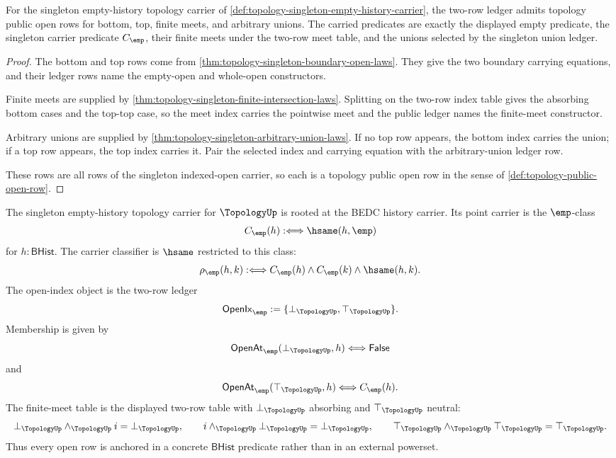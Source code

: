 \begin{theorem}
\label{thm:topology-singleton-public-open-row-coverage}
For the singleton empty-history topology carrier of \autoref{def:topology-singleton-empty-history-carrier}, the two-row ledger admits topology public open rows for bottom, top, finite meets, and arbitrary unions. The carried predicates are exactly the displayed empty predicate, the singleton carrier predicate $C_{\emp}$, their finite meets under the two-row meet table, and the unions selected by the singleton union ledger.
\end{theorem}
\begin{proof}
The bottom and top rows come from \autoref{thm:topology-singleton-boundary-open-laws}. They give the two boundary carrying equations, and their ledger rows name the empty-open and whole-open constructors.

Finite meets are supplied by \autoref{thm:topology-singleton-finite-intersection-laws}. Splitting on the two-row index table gives the absorbing bottom cases and the top-top case, so the meet index carries the pointwise meet and the public ledger names the finite-meet constructor.

Arbitrary unions are supplied by \autoref{thm:topology-singleton-arbitrary-union-laws}. If no top row appears, the bottom index carries the union; if a top row appears, the top index carries it. Pair the selected index and carrying equation with the arbitrary-union ledger row.

These rows are all rows of the singleton indexed-open carrier, so each is a topology public open row in the sense of \autoref{def:topology-public-open-row}.
\end{proof}

\begin{definition}
\label{def:topology-singleton-empty-history-carrier}
The singleton empty-history topology carrier for $\TopologyUp$ is rooted at the BEDC history carrier. Its point carrier is the $\emp$-class
$$
C_{\emp}(h):\Longleftrightarrow \hsame(h,\emp)
$$
for $h:\mathsf{BHist}$. The carrier classifier is $\hsame$ restricted to this class:
$$
\rho_{\emp}(h,k):\Longleftrightarrow
C_{\emp}(h)\wedge C_{\emp}(k)\wedge \hsame(h,k).
$$
The open-index object is the two-row ledger
$$
\mathsf{OpenIx}_{\emp}:=\{\bot_{\TopologyUp},\top_{\TopologyUp}\}.
$$
Membership is given by
$$
\mathsf{OpenAt}_{\emp}(\bot_{\TopologyUp},h)\Longleftrightarrow\mathsf{False}
$$
and
$$
\mathsf{OpenAt}_{\emp}(\top_{\TopologyUp},h)\Longleftrightarrow C_{\emp}(h).
$$
The finite-meet table is the displayed two-row table with $\bot_{\TopologyUp}$ absorbing and $\top_{\TopologyUp}$ neutral:
$$
\bot_{\TopologyUp}\wedge_{\TopologyUp}i=\bot_{\TopologyUp},\qquad
i\wedge_{\TopologyUp}\bot_{\TopologyUp}=\bot_{\TopologyUp},\qquad
\top_{\TopologyUp}\wedge_{\TopologyUp}\top_{\TopologyUp}=\top_{\TopologyUp}.
$$
Thus every open row is anchored in a concrete $\mathsf{BHist}$ predicate rather than in an external powerset.
\end{definition}

